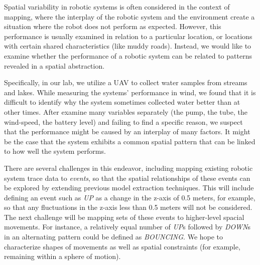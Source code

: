 Spatial variability in robotic systems is often considered in the context of mapping, where the interplay of the robotic system and the environment create a situation where the robot does not perform as expected.
However, this performance is usually examined in relation to a particular location, or locations with certain shared characteristics (like muddy roads).
Instead, we would like to examine whether the performance of a robotic system can be related to patterns revealed in a spatial abstraction.

Specifically, in our lab, we utilize a UAV to collect water samples from streams and lakes.
While measuring the systems' performance in wind, we found that it is difficult to identify why the system sometimes collected water better than at other times.
After examine many variables separately (the pump, the tube, the wind-speed, the battery level) and failing to find a specific reason, we suspect that the performance might be caused by an interplay of many factors.
It might be the case that the system exhibits a common spatial pattern that can be linked to how well the system performs.




There are several challenges in this endeavor, including mapping existing robotic system trace data to \emph{events}, so that the spatial relationships of these events can be explored by extending previous model extraction techniques. 
This will include defining an event such as \emph{UP} as a change in the z-axis of 0.5 meters, for example, so that any fluctuations in the z-axis less than 0.5 meters will not be considered.  
The next challenge will be mapping sets of these events to higher-level spacial movements.  
For instance, a relatively equal number of \emph{UP}s followed by \emph{DOWN}s in an alternating pattern could be defined as \emph{BOUNCING}.
We hope to characterize shapes of movements as well as spatial constraints (for example, remaining within a sphere of motion). 

